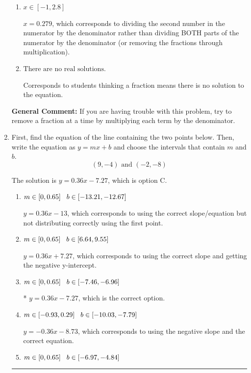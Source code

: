 \documentclass{extbook}[14pt]
\newcommand{\litem}[1]{\item #1

\rule{\textwidth}{0.4pt}}
\begin{document}
\begin{enumerate}
{\begin{enumerate}[label=\Alph*.]
 $x = 12.833$, which corresponds to dividing the coefficients in front of x by the denominator rather than dividing BOTH parts of the numerator by the denominator (or removing the fractions through multiplication).
\item \( x \in [-1, 2.8] \)

 $x = 0.279$, which corresponds to dividing the second number in the numerator by the denominator rather than dividing BOTH parts of the numerator by the denominator (or removing the fractions through multiplication).
\item \( \text{There are no real solutions.} \)

Corresponds to students thinking a fraction means there is no solution to the equation.
\end{enumerate}

\textbf{General Comment:} If you are having trouble with this problem, try to remove a fraction at a time by multiplying each term by the denominator.
}
\litem{
First, find the equation of the line containing the two points below. Then, write the equation as $ y=mx+b $ and choose the intervals that contain $m$ and $b$.
\[ (9, -4) \text{ and } (-2, -8) \]

The solution is \( y = 0.36x -7.27 \), which is option C.\begin{enumerate}[label=\Alph*.]
\item \( m \in [0, 0.65] \hspace*{3mm} b \in [-13.21, -12.67] \)

 $y = 0.36x -13$, which corresponds to using the correct slope/equation but not distributing correctly using the first point.
\item \( m \in [0, 0.65] \hspace*{3mm} b \in [6.64, 9.55] \)

 $y = 0.36x + 7.27$, which corresponds to using the correct slope and getting the negative y-intercept.
\item \( m \in [0, 0.65] \hspace*{3mm} b \in [-7.46, -6.96] \)

* $y = 0.36x -7.27$, which is the correct option.
\item \( m \in [-0.93, 0.29] \hspace*{3mm} b \in [-10.03, -7.79] \)

 $y = -0.36x -8.73$, which corresponds to using the negative slope and the correct equation.
\item \( m \in [0, 0.65] \hspace*{3mm} b \in [-6.97, -4.84] \)


\end{enumerate}}
\end{enumerate}
\end{document}
